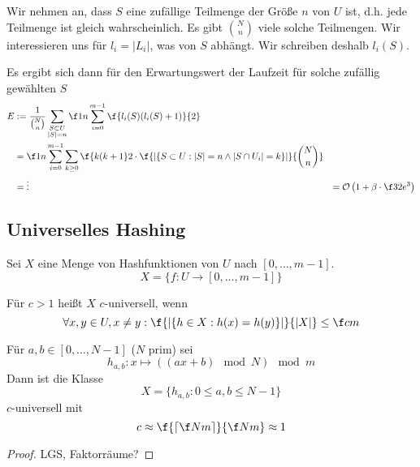 \documentclass[11pt]{scrartcl}
\renewcommand{\O}{\mathcal{O}}
\begin{document}
Wir nehmen an, dass $S$ eine zufällige Teilmenge der Größe $n$ von $U$ ist, d.h. jede Teilmenge ist gleich wahrscheinlich.
Es gibt $\binom Nn$ viele solche Teilmengen.
Wir interessieren uns für $l_i = |L_i|$, was von $S$ abhängt.
Wir schreiben deshalb $l_i(S)$.

Es ergibt sich dann für den Erwartungswert der Laufzeit für solche zufällig gewählten $S$
\begin{align*}
	E &:= \frac 1 {\binom Nn}\sum_{\substack{S\subset U\\|S|=n}}\f 1n \sum_{i=0}^{m-1}\f{l_i(S)(l_i(S)+1)}{2}\\
	  &=\f 1n \sum_{i=0}^{m-1}\sum_{k\ge 0}\f {k(k+1}2 \cdot \f {|\{S\subset U :|S|=n \land |S\cap U_i| = k\}|}{\binom Nn}\\
   &=\vdots
	&= \O\left(1+ \beta \cdot \f 32 e^3\right)
\end{align*}


\subsection{Universelles Hashing}


Sei $X$ eine Menge von Hashfunktionen von $U$ nach $[0,\dotsc, m-1]$. 
\[
	X = \{f:U\to [0,\dotsc, m-1]\}
\]
\begin{df}
	Für $c>1$ heißt $X$ $c$-universell, wenn
	\[
		\forall x,y\in U, x\neq y : \f{|\{h\in X : h(x) = h(y) \}|}{|X|} \le \f cm
	\]
\end{df}


\begin{st}
	Für $a,b\in [0,\dotsc, N-1]$ ($N$ prim) sei
	\[
		h_{a,b} : x\mapsto ((ax+b) \mod N) \mod m
	\]
	Dann ist die Klasse
	\[
		X = \{ h_{a,b} : 0\le a,b \le N-1\}
	\]
	$c$-universell mit
	\[
		c \approx \f{\lceil\f Nm\rceil}{\f Nm} \approx 1
	\]
	\begin{proof}
		LGS, Faktorräume?
	\end{proof}
\end{st}
\end{document}
